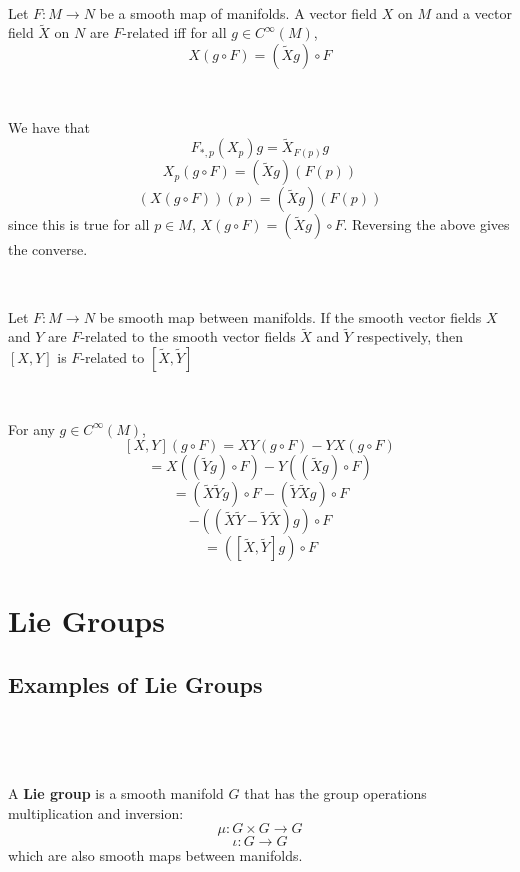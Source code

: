 \documentclass{article}
\begin{document}
\begin{proposition}
  \

  Let $F: M \to N$ be a smooth map of manifolds. A vector field $X$ on $M$ and a vector field $\tilde{X}$ on $N$ are $F$-related iff for all $g \in C^\infty(M)$, $$X(g \circ F) = (\tilde{X}g) \circ F$$
\end{proposition}

\begin{customproof}
  \

  We have that $$F_{*,p}(X_p)g = \tilde{X}_{F(p)}g$$$$X_p(g \circ F) = (\tilde{X}g)(F(p))$$$$(X(g \circ F))(p) = (\tilde{X}g)(F(p))$$since this is true for all $p \in M$, $X(g \circ F) = (\tilde{X}g) \circ F$. Reversing the above gives the converse.
\end{customproof}

\begin{proposition}
  \

  Let $F: M \to N$ be smooth map between manifolds. If the smooth vector fields $X$ and $Y$ are $F$-related to the smooth vector fields $\tilde{X}$ and $\tilde{Y}$ respectively, then $[X,Y]$ is $F$-related to $[\tilde{X}, \tilde{Y}]$
\end{proposition}

\begin{customproof}
  \

  For any $g \in C^\infty(M)$, $$[X,Y](g \circ F) = XY(g \circ F) - YX(g \circ F)$$$$=X((\tilde{Y}g)\circ F) - Y((\tilde{X}g) \circ F)$$$$= (\tilde{X}\tilde{Y}g) \circ F - (\tilde{Y}\tilde{X}g) \circ F$$$$ - ((\tilde{X}\tilde{Y} - \tilde{Y}\tilde{X})g) \circ F$$$$= ([\tilde{X},\tilde{Y}]g) \circ F$$
\end{customproof}

\section{Lie Groups}

\subsection{Examples of Lie Groups}
\

\begin{definition}
  \

  A \textbf{Lie group} is a smooth manifold $G$ that has the group operations multiplication and inversion: $$\mu: G \times G \to G$$$$\iota: G \to G$$which are also smooth maps between manifolds.
\end{definition}
\end{document}
